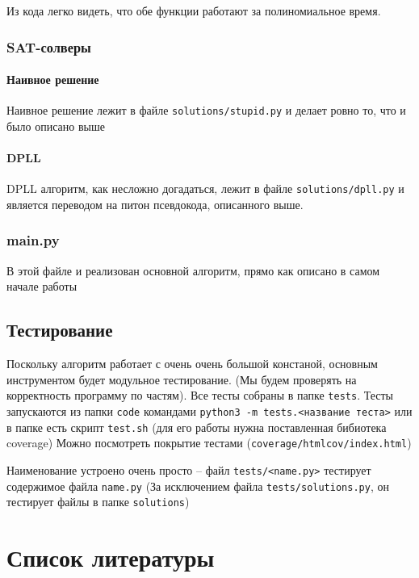 \documentclass[paper=a4, fontsize=11pt]{scrartcl}
\begin{document}
Из кода легко видеть, что обе функции работают за полиномиальное время.

\subsubsection{SAT-солверы}

\paragraph{Наивное решение}

Наивное решение лежит в файле \texttt{solutions/stupid.py} и делает ровно то,
что и было описано выше

\paragraph{DPLL}

DPLL алгоритм, как несложно догадаться, лежит в файле
\texttt{solutions/dpll.py} и является переводом на питон псевдокода, описанного
выше.

\subsubsection{main.py}

В этой файле и реализован основной алгоритм, прямо как описано в самом начале
работы


\subsection{Тестирование}

Поскольку алгоритм работает с очень очень большой констаной, основным
инструментом будет модульное тестирование. (Мы будем проверять на корректность
программу по частям). Все тесты собраны в папке \texttt{tests}.
Тесты запускаются из папки \texttt{code} командами
\texttt{python3 -m tests.<название теста>} или в папке 
есть скрипт \texttt{test.sh} (для его работы нужна поставленная бибиотека
coverage)  Можно посмотреть покрытие тестами
(\texttt{coverage/htmlcov/index.html})

Наименование устроено очень просто -- файл \texttt{tests/<name.py>} тестирует
содержимое файла \texttt{name.py} (За исключением файла \texttt{tests/solutions.py},
он тестирует файлы в папке \texttt{solutions})

\section{Список литературы}
\end{document}
